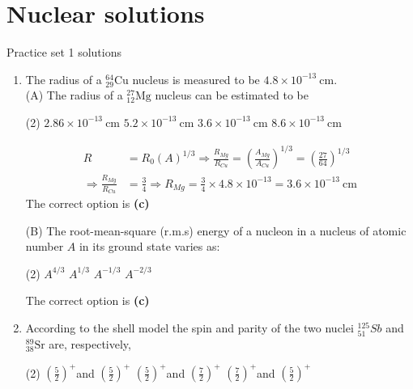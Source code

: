 \chapter{Nuclear solutions}
\begin{abox}
	Practice set 1 solutions
	\end{abox}
\begin{enumerate}
	\item The radius of a ${ }_{29}^{64} \mathrm{Cu}$ nucleus is measured to be $4.8 \times 10^{-13} \mathrm{~cm}$.
	{}\\
(A) The radius of a ${ }_{12}^{27} \mathrm{Mg}$ nucleus can be estimated to be
\begin{tasks}(2)
	\task[\textbf{A.}] $2.86 \times 10^{-13} \mathrm{~cm}$
	\task[\textbf{B.}]$5.2 \times 10^{-13} \mathrm{~cm}$
	\task[\textbf{C.}] $3.6 \times 10^{-13} \mathrm{~cm}$
	\task[\textbf{D.}]$8.6 \times 10^{-13} \mathrm{~cm}$
\end{tasks}
\begin{answer}
\begin{align*}
R&=R_{0}(A)^{1 / 3} \Rightarrow \frac{R_{M g}}{R_{C u}}=\left(\frac{A_{M g}}{A_{C u}}\right)^{1 / 3}=\left(\frac{27}{64}\right)^{1 / 3}\\
\Rightarrow \frac{R_{M g}}{R_{C u}}&=\frac{3}{4} \Rightarrow R_{M g}=\frac{3}{4} \times 4.8 \times 10^{-13}=3.6 \times 10^{-13} \mathrm{~cm}
\end{align*}
The correct option is \textbf{(c)}	
\end{answer}
(B) The root-mean-square (r.m.s) energy of a nucleon in a nucleus of atomic number $A$ in its ground state varies as:
\begin{tasks}(2)
	\task[\textbf{A.}] $A^{4 / 3}$
	\task[\textbf{B.}]$A^{1 / 3}$
	\task[\textbf{C.}] $A^{-1 / 3}$
	\task[\textbf{D.}] $A^{-2 / 3}$
\end{tasks}
\begin{answer}
	The correct option is \textbf{(c)}
\end{answer}
	\item According to the shell model the spin and parity of the two nuclei ${ }_{51}^{125} S b$ and ${ }_{38}^{89} \mathrm{Sr}$ are, respectively,
	{}\\
\begin{tasks}(2)
	\task[\textbf{A.}] $\left(\frac{5}{2}\right)^{+}$and $\left(\frac{5}{2}\right)^{+}$
	\task[\textbf{B.}]$\left(\frac{5}{2}\right)^{+}$and $\left(\frac{7}{2}\right)^{+}$
	\task[\textbf{C.}]$\left(\frac{7}{2}\right)^{+}$and $\left(\frac{5}{2}\right)^{+}$

\end{tasks}
\end{enumerate}
